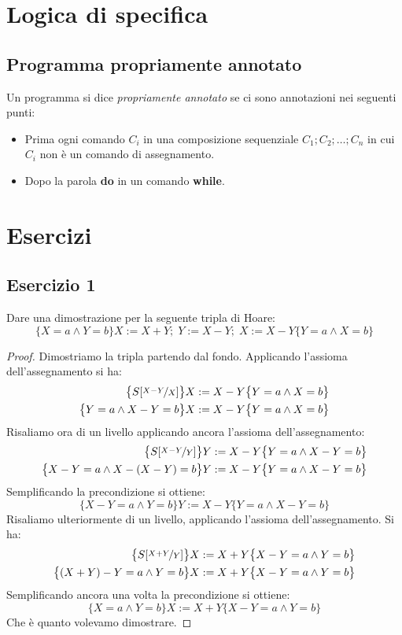 \section{Logica di specifica}


\subsection{Programma propriamente annotato}
\begin{definizione}
Un programma si dice \emph{propriamente annotato} se ci sono annotazioni nei seguenti punti:
\begin{itemize}
        \item Prima ogni comando $C_i$ in una composizione sequenziale $C_1;C_2; \dots ;C_n$ in cui $C_i$ non è un comando di assegnamento.
        \item Dopo la parola \textbf{do} in un comando \textbf{while}.
\end{itemize}
\end{definizione}


\section{Esercizi}

\subsection{Esercizio 1}
Dare una dimostrazione per la seguente tripla di Hoare:
\[ \{X=a  \land Y=b\}  X:=X+Y; \; Y:=X-Y; \; X:=X-Y  \{Y=a  \land  X=b\} \]

\begin{proof}
Dimostriamo la tripla partendo dal fondo. Applicando l'assioma dell'assegnamento si ha:
\begin{align*}
  \bigl\{S[\nicefrac{X-Y}{X}] \bigr\} &  X:=X-Y  \bigl\{Y=a  \land  X=b\bigr\}\\
  \bigl\{Y=a  \land X-Y=b \bigr\} & X:=X-Y  \bigl\{Y=a  \land  X=b\bigr\}
\end{align*} 
Risaliamo ora di un livello applicando ancora l'assioma dell'assegnamento:
\begin{align*}
  \bigl\{S[\nicefrac{X-Y}{Y}] \bigr\} & Y:=X-Y \bigl\{Y=a  \land  X-Y=b\bigr\}\\
  \bigl\{X-Y=a  \land X-(X-Y)=b \bigr\} & Y:=X-Y \bigl\{Y=a  \land  X-Y=b\bigr\}
\end{align*}
Semplificando la precondizione si ottiene:
\[ \bigl\{X-Y=a  \land Y=b \bigr\}  Y:=X-Y  \bigl\{Y=a  \land  X-Y=b\bigr\} \]
Risaliamo ulteriormente di un livello, applicando l'assioma dell'assegnamento. Si ha:
\begin{align*}
  \bigl\{S[\nicefrac{X+Y}{Y}] \bigr\} & X:=X+Y \bigl\{X-Y=a  \land  Y=b\bigr\}\\
  \bigl\{(X+Y)-Y=a  \land Y=b \bigr\} & X:=X+Y \bigl\{X-Y=a  \land  Y=b\bigr\}
\end{align*}
Semplificando ancora una volta la precondizione si ottiene:
\[ \bigl\{X=a  \land Y=b \bigr\}  X:=X+Y  \bigl\{X-Y=a  \land  Y=b\bigr\} \]
Che è quanto volevamo dimostrare.
\end{proof}


